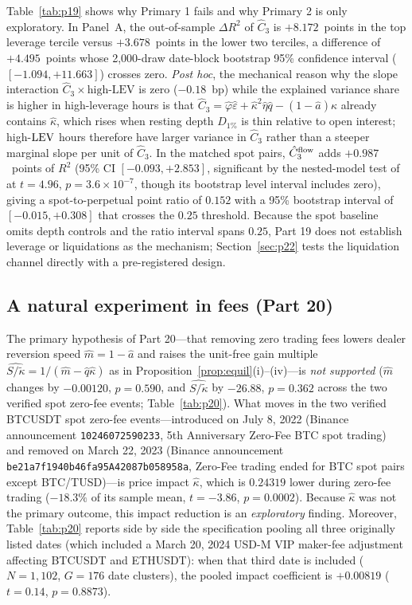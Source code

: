 Table~\ref{tab:p19} shows why Primary 1 fails and why Primary 2 is only exploratory. In Panel~A, the out-of-sample $\Delta R^2$ of $\hat C_3$ is $+8.172$~points in the top leverage tercile versus $+3.678$~points in the lower two terciles, a difference of $+4.495$~points whose 2{,}000-draw date-block bootstrap 95\% confidence interval ($[-1.094,+11.663]$) crosses zero. \emph{Post hoc}, the mechanical reason why the slope interaction $\hat C_3\times\text{high-LEV}$ is zero ($-0.18$~bp) while the explained variance share is higher in high-leverage hours is that $\hat C_3=\hat\varphi\hat\varepsilon+\hat\kappa^2\hat\eta\hat q-(1-\hat a)\hat\kappa$ already contains $\hat\kappa$, which rises when resting depth $D_{1\%}$ is thin relative to open interest; high-${\rm LEV}$ hours therefore have larger variance in $\hat C_3$ rather than a steeper marginal slope per unit of $\hat C_3$. In the matched spot pairs, $\hat C_3^{\rm flow}$ adds $+0.987$~points of $R^2$ (95\% CI $[-0.093,+2.853]$, significant by the nested-model test of \citealp{clark2007} at $t=4.96$, $p=3.6\times10^{-7}$, though its bootstrap level interval includes zero), giving a spot-to-perpetual point ratio of $0.152$ with a 95\% bootstrap interval of $[-0.015,+0.308]$ that crosses the $0.25$ threshold. Because the spot baseline omits depth controls and the ratio interval spans $0.25$, Part 19 does not establish leverage or liquidations as the mechanism; Section~\ref{sec:p22} tests the liquidation channel directly with a pre-registered design.

\subsection{A natural experiment in fees (Part 20)}\label{sec:p20}
The primary hypothesis of Part 20---that removing zero trading fees lowers dealer reversion speed $\hat m=1-\hat a$ and raises the unit-free gain multiple $\widehat{S/\tilde\kappa}=1/(\hat m-\hat q\hat\kappa)$ as in Proposition~\ref{prop:equil}(i)--(iv)---is \emph{not supported} ($\hat m$ changes by $-0.00120$, $p=0.590$, and $\widehat{S/\tilde\kappa}$ by $-26.88$, $p=0.362$ across the two verified spot zero-fee events; Table~\ref{tab:p20}). What moves in the two verified BTCUSDT spot zero-fee events---introduced on July 8, 2022 (Binance announcement \texttt{10246072590233}, 5th Anniversary Zero-Fee BTC spot trading) and removed on March 22, 2023 (Binance announcement \texttt{be21a7f1940b46fa95A42087b058958a}, Zero-Fee trading ended for BTC spot pairs except BTC/TUSD)---is price impact $\hat\kappa$, which is $0.24319$ lower during zero-fee trading ($-18.3\%$ of its sample mean, $t=-3.86$, $p=0.0002$). Because $\hat\kappa$ was not the primary outcome, this impact reduction is an \emph{exploratory} finding. Moreover, Table~\ref{tab:p20} reports side by side the specification pooling all three originally listed dates (which included a March 20, 2024 USD-M VIP maker-fee adjustment affecting BTCUSDT and ETHUSDT): when that third date is included ($N=1{,}102$, $G=176$ date clusters), the pooled impact coefficient is $+0.00819$ ($t=0.14$, $p=0.8873$).

